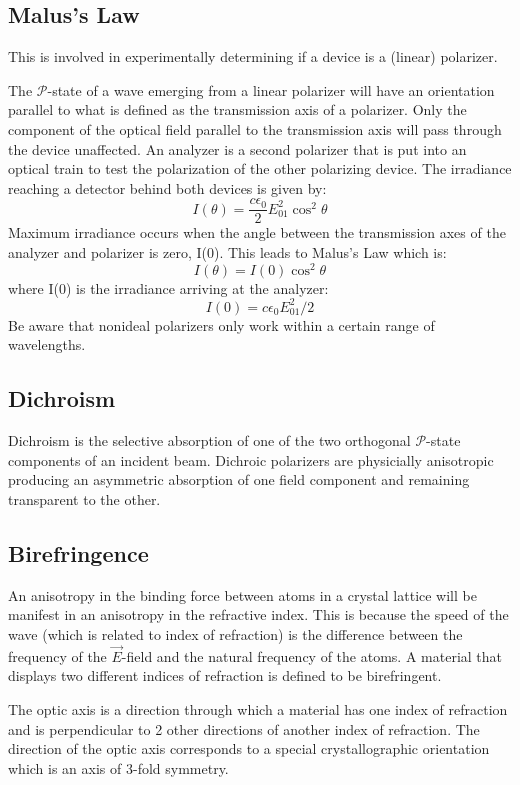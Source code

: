 \documentclass[12pt]{report}
\begin{document}
\subsection{Malus's Law}
This is involved in experimentally determining if a device is a (linear) polarizer. 

The $\mathcal{P}$-state of a wave emerging from a linear polarizer will have an orientation parallel to what is defined as the transmission axis of a polarizer. Only the component of the optical field parallel to the transmission axis will pass through the device unaffected. An analyzer is a second polarizer that is put into an optical train to test the polarization of the other polarizing device. The irradiance reaching a detector behind both devices is given by:
\[I(\theta) = \frac{c\epsilon_0}{2}E_{01}^2\cos ^2 \theta\] 
Maximum irradiance occurs when the angle between the transmission axes of the analyzer and polarizer is zero, I(0). This leads to Malus's Law which is:
\begin{equation}
I(\theta)=I(0)\cos^2\theta
\end{equation}
where I(0) is the irradiance arriving at the analyzer:
\begin{equation}
I(0) = c\epsilon_0E_{01}^2/2
\end{equation}
Be aware that nonideal polarizers only work within a certain range of wavelengths. 
\subsection{Dichroism}
Dichroism is the selective absorption of one of the two orthogonal $\mathcal{P}$-state components of an incident beam. Dichroic polarizers are physicially anisotropic producing an asymmetric absorption of one field component and remaining transparent to the other. 
\subsection{Birefringence}
An anisotropy in the binding force between atoms in a crystal lattice will be manifest in an anisotropy in the refractive index. This is because the speed of the wave (which is related to index of refraction) is the difference between the frequency of the $\vec{E}$-field and the natural frequency of the atoms. A material that displays two different indices of refraction is defined to be birefringent. 

The optic axis is a direction through which a material has one index of refraction and is perpendicular to 2 other directions of another index of refraction. The direction of the optic axis corresponds to a special crystallographic orientation which is an axis of 3-fold symmetry. 
\end{document}
